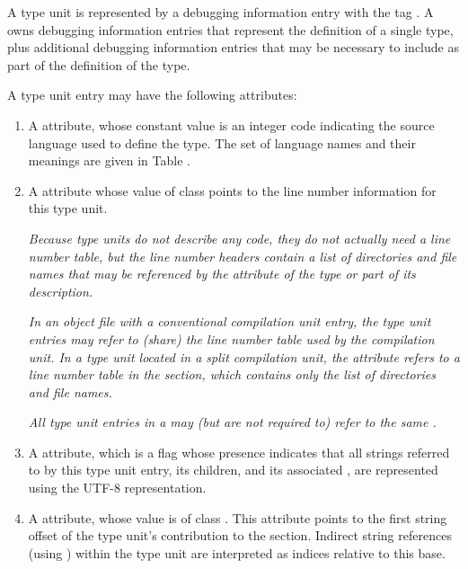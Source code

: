 A type unit is represented by a debugging information entry
with the tag \DWTAGtypeunitTARG. 
A  owns debugging
information entries that represent the definition of a single
type, plus additional debugging information entries that may
be necessary to include as part of the definition of the type.

A type unit entry may have the following attributes:
\begin{enumerate}[1. ]

\item A 
\DWATlanguage{} attribute, 
whose
constant value is an integer code indicating the source
language used to define the type. The set of language names
and their meanings are given in Table .

\item A \DWATstmtlist{} attribute
whose value of class \CLASSlineptr{} points to the line number 
information for this type unit.

\textit{Because type units do not describe any code, they
do not actually need a line number table, but the line number
headers contain a list of directories and file names that
may be referenced by the \DWATdeclfile{} attribute of the
type or part of its description.} 

\textit{In an object file with a conventional compilation 
unit entry, the type unit entries may refer to (share) the 
line number table used by the compilation unit. In a type 
unit located in a split compilation unit, the 
\DWATstmtlistNAME{} attribute refers to a 
line number table in the \dotdebuglinedwo{} section, which
contains only the list of directories and file names.}

\textit{All type unit entries in a \splitDWARFobjectfile{} may 
(but are not required to) refer to the same 
.}

\item A \DWATuseUTFeight{} attribute, which is a flag
whose presence indicates that all strings referred to by this type
unit entry, its children, and its associated 
, 
are represented using the UTF-8 representation.

\item A \DWATstroffsetsbase{}
attribute, whose value is of class \CLASSstroffsetsptr. 
This attribute points
to the first string offset of the type unit's contribution to
the \dotdebugstroffsets{} section. Indirect string references
(using \DWFORMstrxXNor) within the type unit are interpreted
as indices relative to this base.

\end{enumerate}

